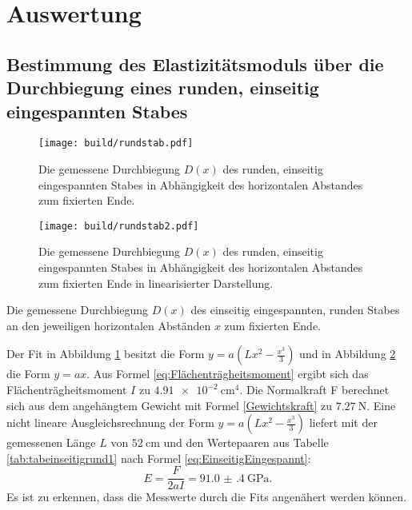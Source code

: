 
\section{Auswertung}
\label{sec:Auswertung}


\subsection{Bestimmung des Elastizitätsmoduls über die Durchbiegung eines runden, einseitig eingespannten Stabes}
\begin{figure}
	\centering
	\caption{Die gemessene Durchbiegung $D(x)$ des runden, einseitig eingespannten Stabes
	 in Abhängigkeit des horizontalen Abstandes zum fixierten Ende.}
	\texttt{[image: build/rundstab.pdf]}
	\label{fig:rund}
\end{figure}
\begin{figure}
	\centering
	\caption{Die gemessene Durchbiegung $D(x)$ des runden, einseitig eingespannten Stabes
	 in Abhängigkeit des horizontalen Abstandes zum fixierten Ende in linearisierter Darstellung.}
	\texttt{[image: build/rundstab2.pdf]}
	\label{fig:rundlinear}
\end{figure}
\begin{table}
	\caption{Die gemessene Durchbiegung $D(x)$ des einseitig eingespannten, runden Stabes an den jeweiligen horizontalen Abständen $x$ zum fixierten Ende.}
	\begin{minipage}{0.5\textwidth}
		\centering
		
	\end{minipage}
	\begin{minipage}{0.5\textwidth}
		\centering
		
	\end{minipage}
\end{table}
Der Fit in Abbildung \ref{fig:rund} besitzt die Form $y = a ( L x^2 - \frac{x^3}{3} ) $ und in Abbildung \ref{fig:rundlinear} die Form $y=a x$. Aus Formel \eqref{eq:Flächenträgheitsmoment} ergibt sich das Flächenträgheitsmoment $I$ zu $\SI{4.91e-2}{\centi\meter\tothe{4}}$. Die Normalkraft F berechnet sich aus dem angehängtem Gewicht mit Formel \eqref{Gewichtskraft} zu $\SI{7.27}{\newton}$. Eine nicht lineare Ausgleichsrechnung der Form $y = a ( L x^2 - \frac{x^3}{3})$ liefert mit der gemessenen Länge $L$ von $\SI{52}{\centi\meter}$ und den Wertepaaren aus Tabelle \ref{tab:tabeinseitigrund1} nach Formel \eqref{eq:EinseitigEingespannt}:
\begin{displaymath}
	E = \frac{F}{2 a I}= \SI{91.0(4)}{\giga\pascal}\text{.}
\end{displaymath}
Es ist zu erkennen, dass die Messwerte durch die Fits angenähert werden können.



